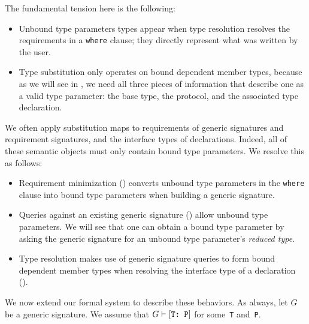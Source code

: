 \documentclass[../generics]{subfiles}
\begin{document}
The fundamental tension here is the following:
\begin{itemize}
\item Unbound type parameters types appear when type resolution resolves the requirements in a \texttt{where} clause; they directly represent what was written by the user.

\item Type substitution only operates on bound dependent member types, because as we will see in , we need all three pieces of information that describe one as a valid type parameter: the base type, the protocol, and the associated type declaration.
\end{itemize}
We often apply substitution maps to requirements of generic signatures and requirement signatures, and the interface types of declarations. Indeed, all of these semantic objects must only contain bound type parameters. We resolve this as follows:
\begin{itemize}
\item Requirement minimization () converts unbound type parameters in the \texttt{where} clause into bound type parameters when building a generic signature.
\item Queries against an existing generic signature () allow unbound type parameters. We will see that one can obtain a bound type parameter by asking the generic signature for an unbound type parameter's \emph{reduced type}.
\item Type resolution makes use of generic signature queries to form bound dependent member types when resolving the interface type of a declaration ().
\end{itemize}

We now extend our formal system to describe these behaviors. As always, let $G$ be a generic signature. We assume that $G\vdash[\texttt{T:~P}]$ for some~\texttt{T} and~\texttt{P}.
\end{document}
